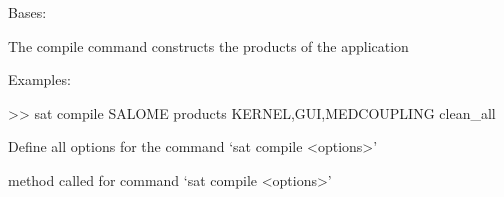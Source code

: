\documentclass[a4paper,10pt,english]{sphinxmanual}
\begin{document}
\begin{fulllineitems}
\label{\detokenize{apidoc_commands/commands:commands.compile.Command}}
Bases: 

The compile command constructs the products of the application

\begin{DUlineblock}{0em}
\item[] Examples:
\item[] \textgreater{}\textgreater{} sat compile SALOME \textendash{}products KERNEL,GUI,MEDCOUPLING \textendash{}clean\_all
\end{DUlineblock}

\begin{fulllineitems}
\label{\detokenize{apidoc_commands/commands:commands.compile.Command.getParser}}
Define all options for the command ‘sat compile \textless{}options\textgreater{}’

\end{fulllineitems}


\begin{fulllineitems}
\label{\detokenize{apidoc_commands/commands:commands.compile.Command.name}}
\end{fulllineitems}


\begin{fulllineitems}
\label{\detokenize{apidoc_commands/commands:commands.compile.Command.run}}
method called for command ‘sat compile \textless{}options\textgreater{}’

\end{fulllineitems}


\end{fulllineitems}

\end{document}
